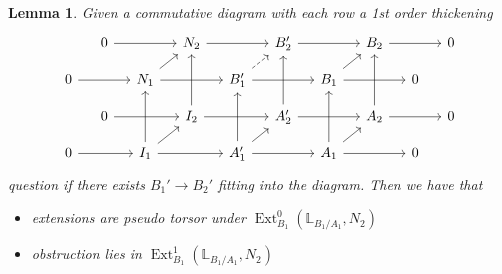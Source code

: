 \documentclass{ctexart}
\newtheorem{lemma}{Lemma}[section]
\newcommand{\ext}{\operatorname{Ext}}
\begin{document}
\begin{lemma}
    Given a commutative diagram with each row a 1st order thickening 
    \begin{equation}
        \begin{tikzcd}[sep = small]
            & 0 \arrow[rr] &&
            N_{2} \arrow[rr] &&
            B_{2}' \arrow[rr] &&
            B_{2} \arrow[rr] &&
            0 \\
            0 \arrow[rr] &&
            N_{1} \arrow[ur] \arrow[rr] &&
            B_{1}' \arrow[ur, dashrightarrow] \arrow[rr] &&
            B_{1} \arrow[ur] \arrow[rr] &&
            0 & \\
            & 0 \arrow[rr] &&
            I_{2} \arrow[uu] \arrow[rr] &&
            A_{2}' \arrow[uu] \arrow[rr] &&
            A_{2} \arrow[uu] \arrow[rr] &&
            0 \\
            0 \arrow[rr] &&
            I_{1} \arrow[uu] \arrow[ur] \arrow[rr] &&
            A_{1}' \arrow[uu] \arrow[ur] \arrow[rr] &&
            A_{1} \arrow[uu] \arrow[ur] \arrow[rr] &&
            0 &
        \end{tikzcd}
    \end{equation}
    question if there exists $B_{1}' \rightarrow B_{2}'$ fitting into the diagram.
    Then we have that
    \begin{itemize}
        \item extensions are pseudo torsor under $\ext_{B_{1}}^{0}(\mathbb{L}_{B_{1}/A_{1}}, N_{2})$
        \item obstruction lies in $\ext_{B_{1}}^{1}(\mathbb{L}_{B_{1}/A_{1}}, N_{2})$
    \end{itemize}
    \label{Lemma 7.8}
\end{lemma}
\end{document}
